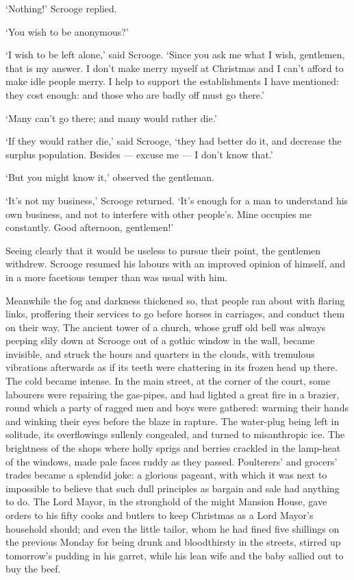\documentclass[11pt,twoside]{article}\makeatletter
\begin{document}
‘Nothing!’ Scrooge replied.\par
‘You wish to be anonymous?’\par
‘I wish to be left alone,’ said Scrooge. ‘Since  you ask me what I wish, gentlemen, that is my answer. I don't make merry myself at Christmas and I can't afford to make idle people merry. I help to support the establishments I have mentioned: they cost enough: and those who are badly off must go there.’\par
‘Many can't go there; and many would rather die.’\par
‘If they would rather die,’ said Scrooge, ‘they had better do it, and decrease the surplus population. Besides — excuse me — I don't know that.’\par
‘But you might know it,’ observed the gentleman.\par
‘It's not my business,’ Scrooge returned. ‘It's enough for a man to understand his own business, and not to interfere with other people's. Mine occupies me constantly. Good afternoon, gentlemen!’\par
Seeing clearly that it would be useless to pursue their point, the gentlemen withdrew. Scrooge resumed his labours with an improved opinion of himself, and in a more facetious temper than was usual with him. \par
Meanwhile the fog and darkness thickened so, that people ran about with flaring links, proffering their services to go before horses in carriages, and conduct them on their way. The ancient tower of a church, whose gruff old bell was always peeping slily down at Scrooge out of a gothic window in the wall, became invisible, and struck the hours and quarters in the clouds, with tremulous vibrations afterwards as if its teeth were chattering in its frozen head up there. The cold became intense. In the main street, at the corner of the court, some labourers were repairing the gas-pipes, and had lighted a great fire in a brazier, round which a party of ragged men and boys were gathered: warming their hands and winking their eyes before the blaze in rapture. The water-plug being left in solitude, its overflowings sullenly congealed, and turned to misanthropic ice. The brightness of the shops where holly sprigs and berries crackled in the lamp-heat of the windows, made pale faces ruddy as they passed. Poulterers' and grocers' trades became a splendid joke: a glorious pageant, with which it was next to impossible to believe that such dull principles as bargain and sale had anything to do. The Lord Mayor, in the stronghold of the might Mansion House, gave orders to his fifty cooks and butlers to keep Christmas as a Lord Mayor's household should; and even the little tailor, whom he had fined five shillings on the previous Monday for being drunk and bloodthirsty in the streets, stirred up tomorrow's pudding in his garret, while his lean wife and the baby sallied out to buy the beef.\par
\end{document}
